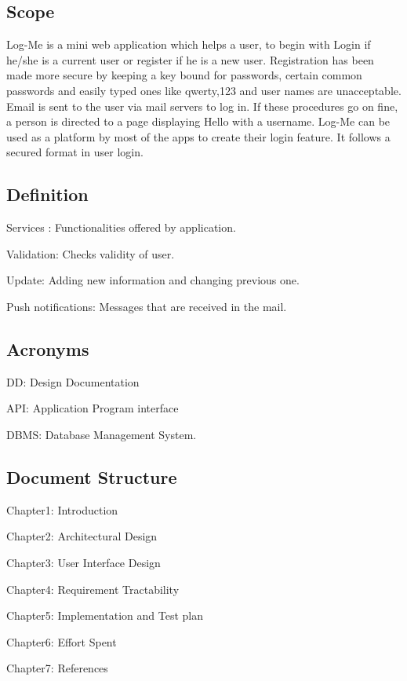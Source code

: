 \documentclass[11pt, english]{article}
\begin{document}
\subsection{Scope}
\newline
Log-Me is a mini web application which helps a user, to begin with Login if he/she is a current user or register if he is a new user. Registration has been made more secure by keeping a key bound for passwords, certain common passwords and easily typed ones like qwerty,123 and user names are unacceptable. Email is sent to the user via mail servers to log in.
\newline
If these procedures go on fine, a person is directed to a page displaying Hello with a username. Log-Me can be used as a platform by most of the apps to create their login feature. It follows a secured format in user login.
\subsection{Definition}
\newline
\item Services : Functionalities offered by application.
\item Validation: Checks validity of user.
\item Update: Adding new information and changing previous one.
\item Push notifications: Messages that are received in the mail.


\subsection{Acronyms}
\newline
\item DD: Design Documentation
\item API: Application Program interface
\item DBMS: Database Management System.


\subsection{Document Structure}
\item Chapter1: Introduction
\item Chapter2: Architectural  Design
\item Chapter3: User Interface Design
\item Chapter4: Requirement Tractability
\item Chapter5: Implementation and Test plan
\item Chapter6: Effort Spent
\item Chapter7: References
\end{document}
